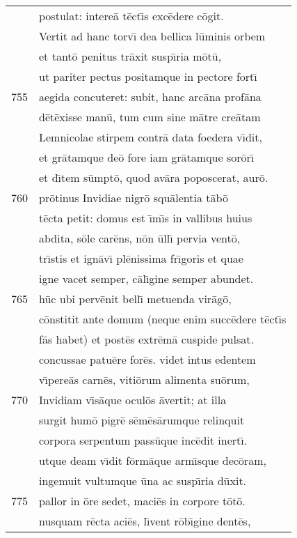 \documentclass[paper=6in:9in,pagesize=pdftex,
               headinclude=on,footinclude=on,12pt]{scrbook}
\begin{document}
\begin{longtable}[p]{ r l }
 & postulat: intere\=a t\=ect\={\i}s exc\=edere c\=ogit.\\ 
 & \indent Vertit ad hanc torv\={\i} dea bellica l\=uminis orbem\\ 
 & et tant\=o penitus tr\=axit susp\={\i}ria m\=ot\=u,\\ 
 & ut pariter pectus positamque in pectore fort\={\i}\\ 
755 & aegida concuteret: subit, hanc arc\=ana prof\=ana\\ 
 & d\=et\=exisse man\=u, tum cum sine m\=atre cre\=atam\\ 
 & Lemnicolae stirpem contr\=a data foedera v\={\i}dit,\\ 
 & et gr\=atamque de\=o fore iam gr\=atamque sor\=or\={\i}\\ 
 & et d\={\i}tem s\=umpt\=o, quod av\=ara poposcerat, aur\=o.\\ 
760 & pr\=otinus Invidiae nigr\=o squ\=alentia t\=ab\=o\\ 
 & t\=ecta petit: domus est \={\i}m\={\i}s in vallibus huius\\ 
 & abdita, s\=ole car\=ens, n\=on \=ull\={\i} pervia vent\=o,\\ 
 & tr\={\i}stis et ign\=av\={\i} pl\=enissima fr\={\i}goris et quae\\ 
 & igne vacet semper, c\=al\={\i}gine semper abundet.\\ 
765 & h\=uc ubi perv\=enit bell\={\i} metuenda vir\=ag\=o,\\ 
 & c\=onstitit ante domum (neque enim succ\=edere t\=ect\={\i}s\\ 
 & f\=as habet) et post\=es extr\=em\=a cuspide pulsat.\\ 
 & concussae patu\=ere for\=es. videt intus edentem\\ 
 & v\={\i}pere\=as carn\=es, viti\=orum alimenta su\=orum,\\ 
770 & Invidiam v\={\i}s\=aque ocul\=os \=avertit; at illa\\ 
 & surgit hum\=o pigr\=e s\=em\=es\=arumque relinquit\\ 
 & corpora serpentum pass\=uque inc\=edit inert\={\i}.\\ 
 & utque deam v\={\i}dit f\=orm\=aque arm\={\i}sque dec\=oram,\\ 
 & ingemuit vultumque \=una ac susp\={\i}ria d\=uxit.\\ 
775 & pallor in \=ore sedet, maci\=es in corpore t\=ot\=o.\\ 
 & nusquam r\=ecta aci\=es, l\={\i}vent r\=ob\={\i}gine dent\=es,\\ 

\end{longtable}
\end{document}
